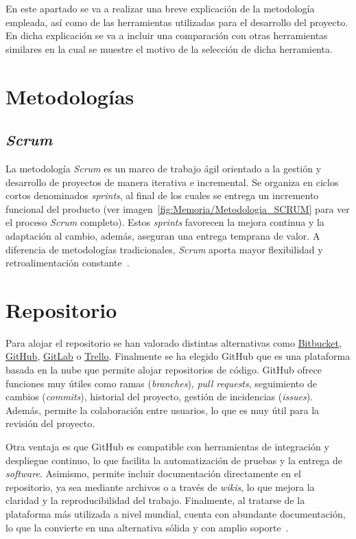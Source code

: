 En este apartado se va a realizar una breve explicación de la metodología empleada, así como de las herramientas utilizadas para el desarrollo del proyecto. En dicha explicación se va a incluir una comparación con otras herramientas similares en la cual se muestre el motivo de la selección de dicha herramienta. 
\section{Metodologías}

\subsection{\textit{Scrum}}
La metodología \textit{Scrum} es un marco de trabajo ágil orientado a la gestión y desarrollo de proyectos de manera iterativa e incremental. Se organiza en ciclos cortos denominados \textit{sprints}, al final de los cuales se entrega un incremento funcional del producto (ver imagen~\ref{fig:Memoria/Metodologia_SCRUM} para ver el proceso \textit{Scrum} completo). Estos \textit{sprints} favorecen la mejora continua y la adaptación al cambio, además, aseguran una entrega temprana de valor. A diferencia de metodologías tradicionales, \textit{Scrum} aporta mayor flexibilidad y retroalimentación constante~\cite{scrum:guide}. 


\section{Repositorio}
Para alojar el repositorio se han valorado distintas alternativas como \href{https://bitbucket.org/}{Bitbucket}, \href{https://github.com/}{GitHub}, \href{https://gitlab.com/}{GitLab} o \href{https://trello.com/}{Trello}. Finalmente se ha elegido GitHub que es una plataforma basada en la nube que permite alojar repositorios de código. GitHub ofrece funciones muy útiles como ramas (\textit{branches}), \textit{pull requests}, seguimiento de cambios (\textit{commits}), historial del proyecto, gestión de incidencias (\textit{issues}). Además, permite la colaboración entre usuarios, lo que es muy útil para la revisión del proyecto.

Otra ventaja es que GitHub es compatible con herramientas de integración y despliegue continuo, lo que facilita la automatización de pruebas y la entrega de \textit{software}. Asimismo, permite incluir documentación directamente en el repositorio, ya sea mediante archivos  o a través de \textit{wikis}, lo que mejora la claridad y la reproducibilidad del trabajo. Finalmente, al tratarse de la plataforma más utilizada a nivel mundial, cuenta con abundante documentación, lo que la convierte en una alternativa sólida y con amplio soporte~\cite{gitHub}.

